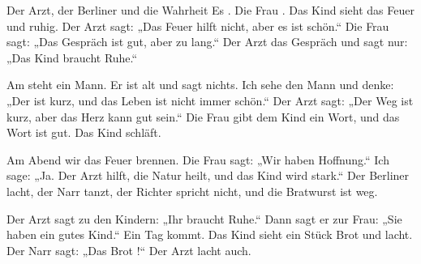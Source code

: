 \documentclass[12pt]{nextbook}
\begin{document}
\begin{readersection}{Der Arzt, der Berliner und die Wahrheit}
Es . Die Frau  . Das Kind sieht das Feuer und  ruhig. Der Arzt sagt: „Das Feuer hilft nicht, aber es ist schön.“ Die Frau sagt: „Das Gespräch ist gut, aber zu lang.“ Der Arzt  das Gespräch und sagt nur: „Das Kind braucht Ruhe.“

Am  steht ein Mann. Er ist alt und sagt nichts. Ich sehe den Mann und denke: „Der  ist kurz, und das Leben ist nicht immer schön.“ Der Arzt sagt: „Der Weg ist kurz, aber das Herz kann gut sein.“ Die Frau gibt dem Kind ein Wort, und das Wort ist gut. Das Kind schläft.

Am Abend  wir das Feuer brennen. Die Frau sagt: „Wir haben Hoffnung.“ Ich sage: „Ja. Der Arzt hilft, die Natur heilt, und das Kind wird stark.“ Der Berliner lacht, der Narr tanzt, der Richter spricht nicht, und die Bratwurst ist weg.

Der Arzt sagt zu den Kindern: „Ihr braucht Ruhe.“ Dann sagt er zur Frau: „Sie haben ein gutes Kind.“ Ein  Tag kommt. Das Kind sieht ein  Stück Brot und lacht. Der Narr sagt: „Das Brot !“ Der Arzt lacht auch.

\end{readersection}
\end{document}
